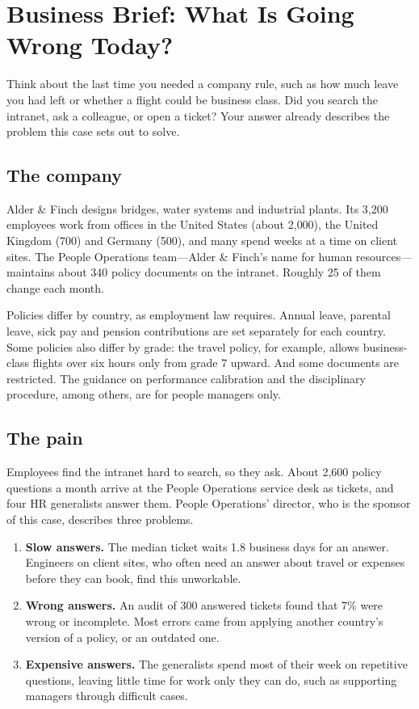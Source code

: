\section{Business Brief: What Is Going Wrong Today?}
\label{sec:policy-brief}

\begin{thinkabout}
Think about the last time you needed a company rule, such as how much leave you had left or whether a flight could be business class. Did you search the intranet, ask a colleague, or open a ticket? Your answer already describes the problem this case sets out to solve.
\end{thinkabout}

\subsection{The company}

Alder \& Finch designs bridges, water systems and industrial plants. Its 3{,}200 employees work from offices in the United States (about 2{,}000), the United Kingdom (700) and Germany (500), and many spend weeks at a time on client sites. The People Operations team---Alder \& Finch's name for human resources---maintains about 340 policy documents on the intranet. Roughly 25 of them change each month.

Policies differ by country, as employment law requires. Annual leave, parental leave, sick pay and pension contributions are set separately for each country. Some policies also differ by grade: the travel policy, for example, allows business-class flights over six hours only from grade 7 upward. And some documents are restricted. The guidance on performance calibration and the disciplinary procedure, among others, are for people managers only.

\subsection{The pain}

Employees find the intranet hard to search, so they ask. About 2{,}600 policy questions a month arrive at the People Operations service desk as tickets, and four HR generalists answer them. People Operations' director, who is the sponsor of this case, describes three problems.

\begin{enumerate}[itemsep=1pt]
  \item \textbf{Slow answers.} The median ticket waits 1.8 business days for an answer. Engineers on client sites, who often need an answer about travel or expenses before they can book, find this unworkable.
  \item \textbf{Wrong answers.} An audit of 300 answered tickets found that 7\% were wrong or incomplete. Most errors came from applying another country's version of a policy, or an outdated one.
  \item \textbf{Expensive answers.} The generalists spend most of their week on repetitive questions, leaving little time for work only they can do, such as supporting managers through difficult cases.
\end{enumerate}

